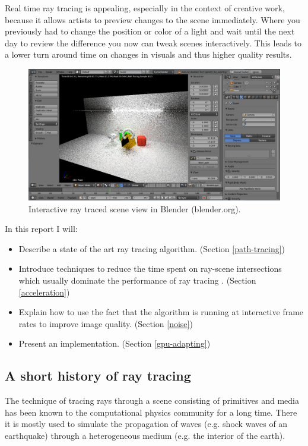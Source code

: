 \documentclass{ACGSeminar}
\begin{document}
Real time ray tracing is appealing, especially in the context of creative work, because it allows artists to preview changes to the scene immediately. Where you previously had to change the position or color of a light and wait until the next day to review the difference you now can tweak scenes interactively. This leads to a lower turn around time on changes in visuals and thus higher quality results.

\begin{figure}[htb!]
  \begin{centering}
    \includegraphics[width=12cm,natwidth=1307,natheight=682]{figures/blender_preview.png}\par
  \end{centering}
  \caption{Interactive ray traced scene view in Blender (blender.org).}
  \label{fig:blender_preview}
\end{figure}

In this report I will:
\begin{itemize}
\item Describe a state of the art ray tracing algorithm. (Section \ref{path-tracing})
\item Introduce techniques to reduce the time spent on ray-scene intersections which usually dominate the performance of ray tracing \cite{Whitted:1980}. (Section \ref{acceleration})
\item Explain how to use the fact that the algorithm is running at interactive frame rates to improve image quality. (Section \ref{noise})
\item Present an implementation. (Section \ref{gpu-adapting})
\end{itemize}


\subsection{A short history of ray tracing}
The technique of tracing rays through a scene consisting of primitives and media has been known to the computational physics community for a long time. There it is mostly used to simulate the propagation of waves (e.g. shock waves of an earthquake) through a heterogeneous medium (e.g. the interior of the earth). \cite{GJI:GJI93}
\end{document}
